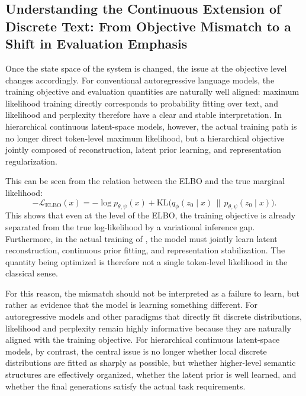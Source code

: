 \subsection{Understanding the Continuous Extension of Discrete Text: From Objective Mismatch to a Shift in Evaluation Emphasis}

Once the state space of the system is changed, the issue at the objective level changes accordingly. For conventional autoregressive language models, the training objective and evaluation quantities are naturally well aligned: maximum likelihood training directly corresponds to probability fitting over text, and likelihood and perplexity therefore have a clear and stable interpretation. In hierarchical continuous latent-space models, however, the actual training path is no longer direct token-level maximum likelihood, but a hierarchical objective jointly composed of reconstruction, latent prior learning, and representation regularization.

This can be seen from the relation between the ELBO and the true marginal likelihood:
\begin{equation}
-\mathcal L_{\mathrm{ELBO}}(x)
=
-\log p_{\theta,\psi}(x)
+
\mathrm{KL}\!\big(
q_\phi(z_0\mid x)\,\|\,p_{\theta,\psi}(z_0\mid x)
\big).
\label{eq:after_inference_gap}
\end{equation}
This shows that even at the level of the ELBO, the training objective is already separated from the true log-likelihood by a variational inference gap. Furthermore, in the actual training of \method, the model must jointly learn latent reconstruction, continuous prior fitting, and representation stabilization. The quantity being optimized is therefore not a single token-level likelihood in the classical sense.

For this reason, the mismatch should not be interpreted as a failure to learn, but rather as evidence that the model is learning something different. For autoregressive models and other paradigms that directly fit discrete distributions, likelihood and perplexity remain highly informative because they are naturally aligned with the training objective. For hierarchical continuous latent-space models, by contrast, the central issue is no longer whether local discrete distributions are fitted as sharply as possible, but whether higher-level semantic structures are effectively organized, whether the latent prior is well learned, and whether the final generations satisfy the actual task requirements.

